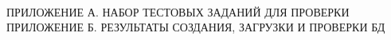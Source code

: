 \tableofcontents
\hspace{0pt}\\
ПРИЛОЖЕНИЕ А. НАБОР ТЕСТОВЫХ ЗАДАНИЙ ДЛЯ ПРОВЕРКИ\\
ПРИЛОЖЕНИЕ Б. РЕЗУЛЬТАТЫ СОЗДАНИЯ, ЗАГРУЗКИ И ПРОВЕРКИ БД\\
\newpage
